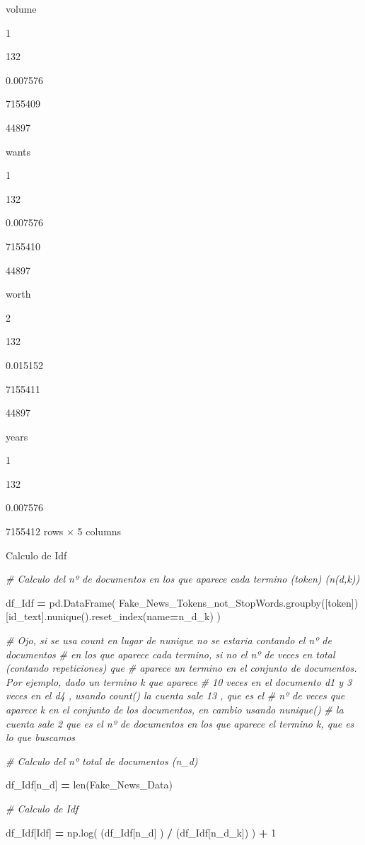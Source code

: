 \documentclass[
  11pt,
  a4paper,
]{article}
\newenvironment{Shaded}{\begin{snugshade}}{\end{snugshade}}
\newcommand{\BuiltInTok}[1]{#1}
\newcommand{\CommentTok}[1]{\textcolor[rgb]{0.56,0.35,0.01}{\textit{#1}}}
\newcommand{\DecValTok}[1]{\textcolor[rgb]{0.00,0.00,0.81}{#1}}
\newcommand{\NormalTok}[1]{#1}
\newcommand{\OperatorTok}[1]{\textcolor[rgb]{0.81,0.36,0.00}{\textbf{#1}}}
\newcommand{\StringTok}[1]{\textcolor[rgb]{0.31,0.60,0.02}{#1}}
\begin{document}
volume

1

132

0.007576

7155409

44897

wants

1

132

0.007576

7155410

44897

worth

2

132

0.015152

7155411

44897

years

1

132

0.007576

7155412 rows × 5 columns

Calculo de Idf

\begin{Shaded}
\begin{Highlighting}[]
\CommentTok{\# Calculo del nº de documentos en los que aparece cada termino (token) (n(d,k))}

\NormalTok{df\_Idf }\OperatorTok{=}\NormalTok{ pd.DataFrame( Fake\_News\_Tokens\_not\_StopWords.groupby([}\StringTok{\textquotesingle{}token\textquotesingle{}}\NormalTok{])[}\StringTok{\textquotesingle{}id\_text\textquotesingle{}}\NormalTok{].nunique().reset\_index(name}\OperatorTok{=}\StringTok{\textquotesingle{}n\_d\_k\textquotesingle{}}\NormalTok{) )}

\CommentTok{\# Ojo, si se usa count en lugar de nunique no se estaria contando el nº de documentos}
\CommentTok{\# en los que aparece cada termino, si no el nº de veces en total (contando repeticiones) que}
\CommentTok{\# aparece un termino en el conjunto de documentos. Por ejemplo, dado un termino k que aparece}
\CommentTok{\# 10 veces en el documento d1 y 3 veces en el d4 , usando count() la cuenta sale 13 , que es el }
\CommentTok{\# nº de veces que aparece k en el conjunto de los documentos, en cambio usando nunique()}
\CommentTok{\#  la cuenta sale 2 que es el nº de documentos en los que aparece el termino k, que es lo que buscamos}

\CommentTok{\# Calculo del nº total de documentos (n\_d)}

\NormalTok{df\_Idf[}\StringTok{\textquotesingle{}n\_d\textquotesingle{}}\NormalTok{] }\OperatorTok{=} \BuiltInTok{len}\NormalTok{(Fake\_News\_Data)}

\CommentTok{\# Calculo de Idf}

\NormalTok{df\_Idf[}\StringTok{\textquotesingle{}Idf\textquotesingle{}}\NormalTok{] }\OperatorTok{=}\NormalTok{ np.log( (df\_Idf[}\StringTok{\textquotesingle{}n\_d\textquotesingle{}}\NormalTok{] ) }\OperatorTok{/}\NormalTok{ (df\_Idf[}\StringTok{\textquotesingle{}n\_d\_k\textquotesingle{}}\NormalTok{]) ) }\OperatorTok{+} \DecValTok{1} 
\end{Highlighting}
\end{Shaded}
\end{document}
